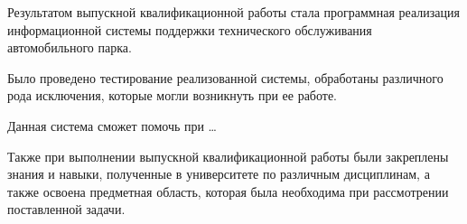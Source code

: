 Результатом выпускной квалификационной работы стала программная реализация
информационной системы поддержки технического обслуживания автомобильного парка.

Было проведено тестирование реализованной системы, обработаны различного рода
исключения, которые могли возникнуть при ее работе.

Данная система сможет помочь при \dots

Также при выполнении выпускной квалификационной работы были закреплены знания и
навыки, полученные в университете по различным дисциплинам, а также освоена
предметная область, которая была необходима при рассмотрении поставленной
задачи.
